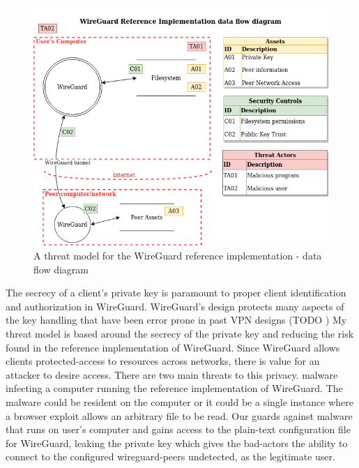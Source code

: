 \documentclass [11pt, proquest] {uwthesis}[2020/02/24]
\begin{document}
\begin{figure}[ht]
\includegraphics[width=14cm]{paper/images/WGH_DFD_preFB.drawio.png}
\caption{A threat model for the WireGuard reference implementation - data flow diagram}
\label{fig:wg_ref_dfd}
\end{figure}


The secrecy of a client's private key is paramount to proper client identification and authorization in WireGuard. WireGuard's design protects many aspects of the key handling that have been error prone in past VPN designs (TODO )
My threat model is based around the secrecy of the private key and reducing the risk found in the reference implementation of WireGuard. Since WireGuard allows clients protected-access to resources across networks, there is value for an attacker to desire access. 
There are two main threats to this privacy.  malware infecting a computer running the reference implementation of WireGuard. The malware could be resident on the computer or it could be a single instance where a browser exploit allows an arbitrary file to be read. Our guards against malware that runs on user's computer and gains access to the plain-text configuration file for WireGuard, leaking the private key which gives the bad-actors the ability to connect to the configured wireguard-peers undetected, as the legitimate user.
\end{document}
